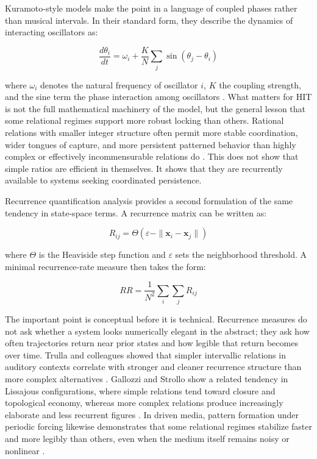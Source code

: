 Kuramoto-style models make the point in a language of coupled phases rather than musical intervals. In their standard form, they describe the dynamics of interacting oscillators as:

\begin{equation}
\frac{d\theta_i}{dt} = \omega_i + \frac{K}{N} \sum_j \sin(\theta_j - \theta_i)
\end{equation}

where $\omega_i$ denotes the natural frequency of oscillator $i$, $K$ the coupling strength, and the sine term the phase interaction among oscillators \parencite{kuramoto_1984}. What matters for HIT is not the full mathematical machinery of the model, but the general lesson that some relational regimes support more robust locking than others. Rational relations with smaller integer structure often permit more stable coordination, wider tongues of capture, and more persistent patterned behavior than highly complex or effectively incommensurable relations do \parencite{acebron_2005, cartwright_2001}. This does not show that simple ratios are efficient in themselves. It shows that they are recurrently available to systems seeking coordinated persistence.

Recurrence quantification analysis provides a second formulation of the same tendency in state-space terms. A recurrence matrix can be written as:

\begin{equation}
R_{ij} = \Theta(\varepsilon - \| \mathbf{x}_i - \mathbf{x}_j \|)
\end{equation}

where $\Theta$ is the Heaviside step function and $\varepsilon$ sets the neighborhood threshold. A minimal recurrence-rate measure then takes the form:

\begin{equation}
RR = \frac{1}{N^2} \sum_i \sum_j R_{ij}
\end{equation}

The important point is conceptual before it is technical. Recurrence measures do not ask whether a system looks numerically elegant in the abstract; they ask how often trajectories return near prior states and how legible that return becomes over time. Trulla and colleagues showed that simpler intervallic relations in auditory contexts correlate with stronger and cleaner recurrence structure than more complex alternatives \parencite{trulla_2018}. Gallozzi and Strollo show a related tendency in Lissajous configurations, where simple relations tend toward closure and topological economy, whereas more complex relations produce increasingly elaborate and less recurrent figures \parencite{gallozzi_2023}. In driven media, pattern formation under periodic forcing likewise demonstrates that some relational regimes stabilize faster and more legibly than others, even when the medium itself remains noisy or nonlinear \parencite{engels_2007, nguyen_2019}.

